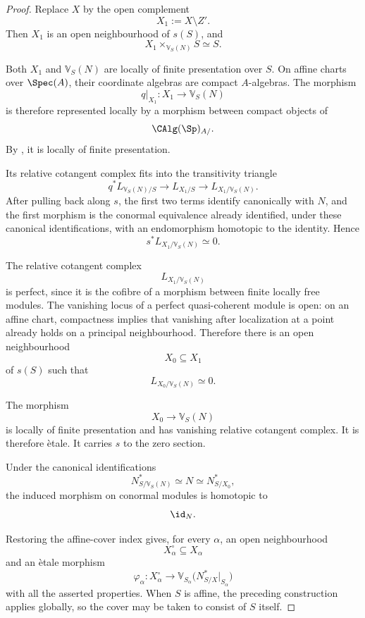\begin{proof}
Replace \(X\) by the open complement
\[
    X_1
    :=
    X\setminus Z'.
\]
Then \(X_1\) is an open neighbourhood of \(s(S)\), and
\[
    X_1
    \times_{\mathbb V_S(N)}
    S
    \simeq
    S.
\]

Both \(X_1\) and \(\mathbb V_S(N)\) are locally of finite presentation
over \(S\). On affine charts over \(\Spec(A)\), their coordinate
algebras are compact \(A\)-algebras. The morphism
\[
    q|_{X_1}
    \colon
    X_1
    \longrightarrow
    \mathbb V_S(N)
\]
is therefore represented locally by a morphism between compact objects
of
\[
    \CAlg(\Sp)_{A/}.
\]
By
,
it is locally of finite presentation.

Its relative cotangent complex fits into the transitivity triangle
\[
    q^*L_{\mathbb V_S(N)/S}
    \longrightarrow
    L_{X_1/S}
    \longrightarrow
    L_{X_1/\mathbb V_S(N)}.
\]
After pulling back along \(s\), the first two terms identify canonically
with \(N\), and the first morphism is the conormal equivalence already
identified, under these canonical identifications, with an endomorphism
homotopic to the identity. Hence
\[
    s^*L_{X_1/\mathbb V_S(N)}
    \simeq
    0.
\]

The relative cotangent complex
\[
    L_{X_1/\mathbb V_S(N)}
\]
is perfect, since it is the cofibre of a morphism between finite locally
free modules. The vanishing locus of a perfect quasi-coherent module is
open: on an affine chart, compactness implies that vanishing after
localization at a point already holds on a principal neighbourhood.
Therefore there is an open neighbourhood
\[
    X_0
    \subseteq
    X_1
\]
of \(s(S)\) such that
\[
    L_{X_0/\mathbb V_S(N)}
    \simeq
    0.
\]

The morphism
\[
    X_0
    \longrightarrow
    \mathbb V_S(N)
\]
is locally of finite presentation and has vanishing relative cotangent
complex. It is therefore \`etale. It carries \(s\) to the zero section.

Under the canonical identifications
\[
    N^*_{S/\mathbb V_S(N)}
    \simeq
    N
    \simeq
    N^*_{S/X_0},
\]
the induced morphism on conormal modules is homotopic to
\[
    \id_N.
\]

Restoring the affine-cover index gives, for every \(\alpha\), an open
neighbourhood
\[
    X_\alpha^\circ
    \subseteq
    X_\alpha
\]
and an \`etale morphism
\[
    \varphi_\alpha
    \colon
    X_\alpha^\circ
    \longrightarrow
    \mathbb V_{S_\alpha}
    \bigl(
        N^*_{S/X}|_{S_\alpha}
    \bigr)
\]
with all the asserted properties. When \(S\) is affine, the preceding
construction applies globally, so the cover may be taken to consist of
\(S\) itself.
\end{proof}

